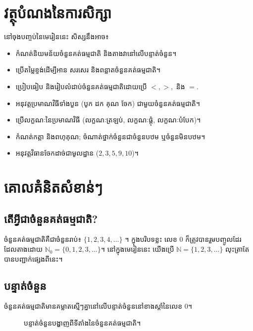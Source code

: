 \section*{វត្ថុបំណងនៃការសិក្សា}
    នៅចុងបញ្ចប់នៃមេរៀននេះ សិស្សនឹងអាច៖
    \begin{itemize}[label=---]
        \item កំណត់និយមន័យចំនួនគត់ធម្មជាតិ និងតាងវានៅលើបន្ទាត់ចំនួន។
        \item ប្រើតម្លៃខ្ទង់ដើម្បីអាន សរសេរ និងពន្លាតចំនួនគត់ធម្មជាតិ។
        \item ប្រៀបធៀប និងរៀបលំដាប់ចំនួនគត់ធម្មជាតិដោយប្រើ $<, >,$ និង $=$.
        \item អនុវត្តប្រមាណវិធីទាំងបួន (បូក ដក គុណ ចែក) ជាមួយចំនួនគត់ធម្មជាតិ។
        \item ប្រើលក្ខណៈនៃប្រមាណវិធី (លក្ខណៈត្រឡប់, លក្ខណៈផ្ដុំ, លក្ខណៈបំបែក)។
        \item កំណត់កត្តា និងពហុគុណ; ចំណាត់ថ្នាក់ចំនួនជាចំនួនបឋម ឬចំនួនមិនបឋម។
        \item អនុវត្តវិធានចែកដាច់ជាមូលដ្ឋាន ($2, 3, 5, 9, 10$)។
    \end{itemize}

\section{គោលគំនិតសំខាន់ៗ}
\subsection{តើអ្វីជាចំនួនគត់ធម្មជាតិ?}
ចំនួនគត់ធម្មជាតិគឺជាចំនួនរាប់៖ $\{1,2,3,4,\dots\}$ ។ ក្នុងបរិបទខ្លះ លេខ $0$ ក៏ត្រូវបានរួមបញ្ចូលដែរ ដែលតាងដោយ $\mathbb{N}_0 = \{0, 1, 2, 3, \dots\}$។ នៅក្នុងមេរៀននេះ យើងប្រើ $\mathbb{N}=\{1,2,3,\dots\}$ លុះត្រាតែបានបញ្ជាក់ផ្សេងពីនេះ។

\subsection{បន្ទាត់ចំនួន}
ចំនួនគត់ធម្មជាតិមានគម្លាតស្មើៗគ្នានៅលើបន្ទាត់ចំនួននៅខាងស្ដាំនៃលេខ $0$។
\begin{figure}[h!]
    \centering
    \caption{បន្ទាត់ចំនួនបង្ហាញពីទីតាំងនៃចំនួនគត់ធម្មជាតិ។}
    \label{fig:number-line}
\end{figure}

